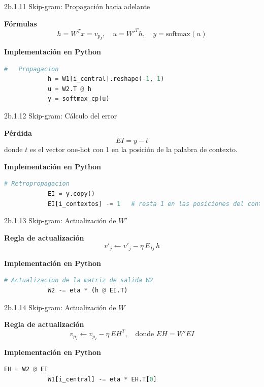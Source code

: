 \documentclass{beamer}
\begin{document}
\begin{frame}[fragile]{2b.1.11 Skip-gram: Propagación hacia adelante}
	\begin{block}{\textbf{Fórmulas}}
		\[
		h = W^T x = v_{p_I}, \quad
		u = W'^T h, \quad
		y = \text{softmax}(u)
		\]
	\end{block}
	
	\begin{block}{\textbf{Implementación en Python}}
		\begin{lstlisting}[language=Python]
			#   Propagacion  
			h = W1[i_central].reshape(-1, 1)   
			u = W2.T @ h                        
			y = softmax_cp(u)                 
		\end{lstlisting}
	\end{block}
\end{frame}

\begin{frame}[fragile]{2b.1.12 Skip-gram: Cálculo del error}
	\begin{block}{\textbf{Pérdida}}
		\[
		EI = y - t
		\]
		donde $t$ es el vector one-hot con 1 en la posición de la palabra de contexto.
	\end{block}
	
	\begin{block}{\textbf{Implementación en Python}}
		\begin{lstlisting}[language=Python]
			# Retropropagacion 
			EI = y.copy()
			EI[i_contextos] -= 1   # resta 1 en las posiciones del contexto
		\end{lstlisting}
	\end{block}
\end{frame}

\begin{frame}[fragile]{2b.1.13 Skip-gram: Actualización de $W'$}
	\begin{block}{\textbf{Regla de actualización}}
		\[
		v'_j \leftarrow v'_j - \eta \, E_{Ij} \, h
		\]
	\end{block}
	
	\begin{block}{\textbf{Implementación en Python}}
		\begin{lstlisting}[language=Python]
			# Actualizacion de la matriz de salida W2
			W2 -= eta * (h @ EI.T)
		\end{lstlisting}
	\end{block}
\end{frame}

\begin{frame}[fragile]{2b.1.14 Skip-gram: Actualización de $W$}
	\begin{block}{\textbf{Regla de actualización}}
		\[
		v_{p_I} \leftarrow v_{p_I} - \eta \, EH^T, 
		\quad \text{donde } EH = W' EI
		\]
	\end{block}
	
	\begin{block}{\textbf{Implementación en Python}}
		\begin{lstlisting}[language=Python]
			EH = W2 @ EI
			W1[i_central] -= eta * EH.T[0]
		\end{lstlisting}
	\end{block}
\end{frame}
	
\end{document}
